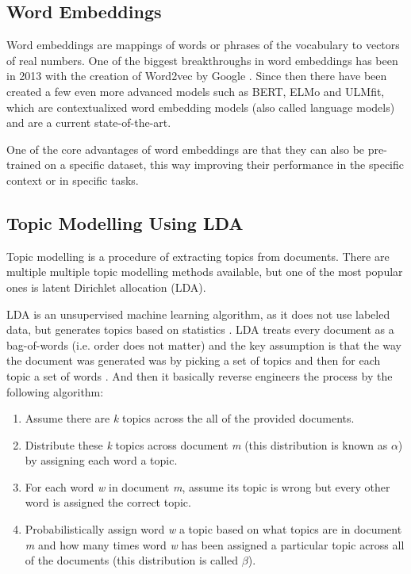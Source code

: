 \subsection{Word Embeddings}
Word embeddings are mappings of words or phrases of the vocabulary to vectors of real numbers. One of the biggest breakthroughs in word embeddings has been in 2013 with the creation of Word2vec by Google \cite{wordembeddingwiki}. Since then there have been created a few even more advanced models such as BERT, ELMo and ULMfit, which are contextualixed word embedding models (also called language models) \cite{languagemodels} and are a current state-of-the-art.

One of the core advantages of word embeddings are that they can also be pre-trained on a specific dataset, this way improving their performance in the specific context or in specific tasks.
\subsection{Topic Modelling Using LDA}
\label{sec:lda}
Topic modelling is a procedure of extracting topics from documents. There are multiple multiple topic modelling methods available, but one of the most popular ones is latent Dirichlet allocation (LDA).

LDA is an unsupervised machine learning algorithm, as it does not use labeled data, but generates topics based on statistics \cite{ldawiki}. LDA treats every document as a bag-of-words (i.e. order does not matter) and the key assumption is that the way the document was generated was by picking a set of topics and then for each topic a set of words \cite{ldaexplanation}. And then it basically reverse engineers the process by the following algorithm:
\begin{enumerate}
\item Assume there are \textit{k} topics across the all of the provided documents.
\item Distribute these \textit{k} topics across document \textit{m} (this distribution is known as $\alpha$) by assigning each word a topic.
\item For each word \textit{w} in document \textit{m}, assume its topic is wrong but every other word is assigned the correct topic.
\item Probabilistically assign word \textit{w} a topic based on what topics are in document \textit{m} and how many times word \textit{w} has been assigned a particular topic across all of the documents (this distribution is called $\beta$).
\end{enumerate}

